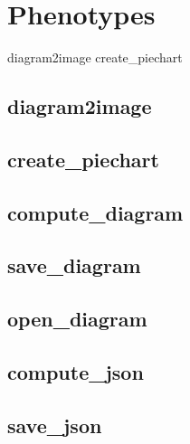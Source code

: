 \documentclass[letterpaper,10pt,english]{sphinxmanual}
\begin{document}
\section{Phenotypes}
\label{\detokenize{Phenotypes::doc}}\label{\detokenize{Phenotypes:phenotypes}}\label{\detokenize{Phenotypes:id1}}
diagram2image
create\_piechart


\subsection{diagram2image}
\label{\detokenize{Phenotypes:diagram2image}}\label{\detokenize{Phenotypes:phenotypes-diagram2image}}

\subsection{create\_piechart}
\label{\detokenize{Phenotypes:phenotypes-create-piechart}}\label{\detokenize{Phenotypes:create-piechart}}

\subsection{compute\_diagram}
\label{\detokenize{Phenotypes:phenotypes-compute-diagram}}\label{\detokenize{Phenotypes:compute-diagram}}

\subsection{save\_diagram}
\label{\detokenize{Phenotypes:phenotypes-save-diagram}}\label{\detokenize{Phenotypes:save-diagram}}

\subsection{open\_diagram}
\label{\detokenize{Phenotypes:open-diagram}}\label{\detokenize{Phenotypes:phenotypes-open-diagram}}

\subsection{compute\_json}
\label{\detokenize{Phenotypes:phenotypes-compute-json}}\label{\detokenize{Phenotypes:compute-json}}

\subsection{save\_json}
\label{\detokenize{Phenotypes:phenotypes-save-json}}\label{\detokenize{Phenotypes:save-json}}
\end{document}
